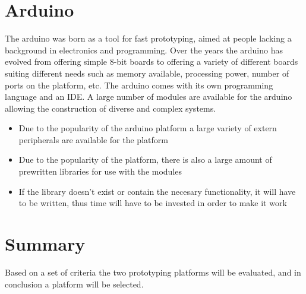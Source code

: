 \section{Arduino}
The arduino was born as a tool for fast prototyping, aimed at people lacking a background in electronics and programming.
Over the years the arduino has evolved from offering simple 8-bit boards to offering a variety of different boards suiting
different needs such as memory available, processing power, number of ports on the platform, etc. The arduino comes with its own programming language and an IDE. A large number of modules are available for the arduino allowing the construction of diverse and complex systems.
\begin{itemize}
	\item Due to the popularity of the arduino platform a large variety of extern peripherals are available for the platform
	\item Due to the popularity of the platform, there is also a large amount of prewritten libraries for use with the modules
	\item If the library doesn't exist or contain the necesary functionality, it will have to be written, thus time will have to be invested in order to make it work
\end{itemize}


\section{Summary}
Based on a set of criteria the two prototyping platforms will be evaluated, and in conclusion a platform will be selected.

